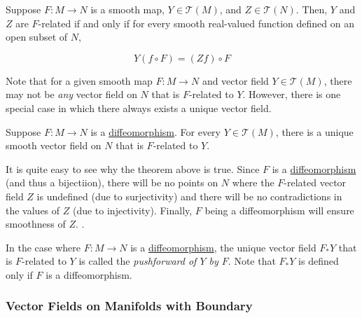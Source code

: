 \documentclass{article}
\newcounter{theorem}[section]
\newcounter{definition}[section]
\begin{document}
      \begin{theorem}
        \label{thm:characterization-of-f-relatedness}
        Suppose $F: M \to N$ is a smooth map, $Y \in \mathcal{T}(M)$, and $Z \in \mathcal{T}(N)$. Then, $Y$ and $Z$ are $F$-related if and only if for every smooth real-valued function defined on an open subset of $N$, 

          \begin{equation}
            Y (f \circ F) = (Z f) \circ F
          \end{equation}
      \end{theorem}

      Note that for a given smooth map $F: M \to N$ and vector field $Y \in \mathcal{T}(M)$, there may not be \textit{any} vector field on $N$ that is $F$-related to $Y$. However, there is one special case in which there always exists a unique vector field. 

      \begin{theorem}
        \label{thm:pushforward-of-a-vector-field-by-a}
        Suppose $F: M \to N$ is a \hyperref[def:diffeomorphism-2]{diffeomorphism}. For every $Y \in \mathcal{T}(M)$, there is a unique smooth vector field on $N$ that is $F$-related to $Y$. 
      \end{theorem}

      It is quite easy to see why the theorem above is true. Since $F$ is a \hyperref[def:diffeomorphism-2]{diffeomorphism} (and thus a bijectiion), there will be no points on $N$ where the $F$-related vector field $Z$ is undefined (due to surjectivity) and there will be no contradictions in the values of $Z$ (due to injectivity). Finally, $F$ being a diffeomorphism will ensure smoothness of $Z$. . 

      \begin{definition}[Pushforward of $Y$ by $F$]
        \label{def:pushforward-of-y-by-f}
        In the case where $F: M \to N$ is a \hyperref[def:diffeomorphism-2]{diffeomorphism}, the unique vector field $F_* Y$ that is $F$-related to $Y$ is called the \textit{pushforward of $Y$ by $F$}. Note that $F_* Y$ is defined only if $F$ is a diffeomorphism.  
      \end{definition}

    \subsubsection{Vector Fields on Manifolds with Boundary}
\end{document}
